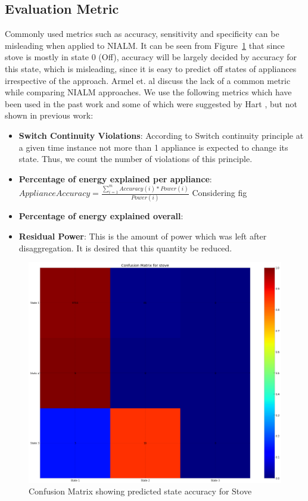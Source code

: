 \documentclass[conference]{IEEEtran}
\newcommand{\figref}[1]{Figure~\ref{#1}}
\begin{document}
\subsection{Evaluation Metric}

Commonly used metrics such as accuracy, sensitivity and specificity can be misleading when applied to NIALM. It can be seen from \figref{fig:confusion} that since stove is mostly in state 0 (Off), accuracy will be largely decided by accuracy for this state, which is misleading, since it is easy to predict off states of appliances irrespective of the approach. Armel et. al \cite{survey1} discuss the lack of a common metric while comparing NIALM approaches. We use the following metrics which have been used in the past work and some of which were suggested by Hart \cite{hart}, but not shown in previous work:
\begin{itemize}
\item \textbf{Switch Continuity Violations}: According to Switch continuity principle at a given time instance not more than 1 appliance is expected to change its state. Thus, we count the number of violations of this principle.
\item \textbf{Percentage of energy explained per appliance}: $Appliance Accuracy = \frac{\sum\limits_{i=1}^{m} Accuracy(i)*Power(i)}{Power(i)} $ Considering fig
\item \textbf{Percentage of energy explained overall}:
\item \textbf{Residual Power}: This is the amount of power which was left after disaggregation. It is desired that this quantity be reduced.
\end{itemize} 
\begin{figure}
\centering \includegraphics[scale=0.1]{./figures/confusion_stove.png}
\caption{Confusion Matrix showing predicted state accuracy for Stove}
   \label{fig:confusion}
\end{figure}
\end{document}
